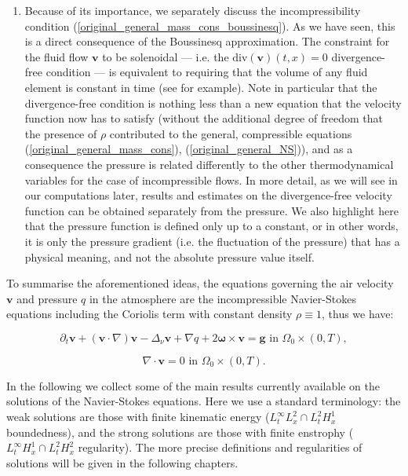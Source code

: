 \documentclass[12pt]{report}
\numberwithin{theorem}{chapter}
\numberwithin{corollary}{chapter}
\numberwithin{lemma}{chapter}
\numberwithin{remark}{chapter}
\numberwithin{definition}{chapter}
\numberwithin{prop}{chapter}
\begin{document}
\begin{enumerate}
\item Because of its importance, we separately discuss the incompressibility condition (\ref{original_general_mass_cons_boussinesq}). As we have seen, this is a direct consequence of the Boussinesq approximation. The constraint for the fluid flow $\mathbf{v}$ to be solenoidal --- i.e. the $\text{div}(\mathbf{v})(t,x) = 0$ divergence-free condition --- is equivalent to requiring that the volume of any fluid element is constant in time (see \cite{boyer2012mathematical} for example). Note in particular that the divergence-free condition is nothing less than a new equation that the velocity function now has to satisfy (without the additional degree of freedom that the presence of $\rho$ contributed to the general, compressible equations (\ref{original_general_mass_cons}), (\ref{original_general_NS})), and as a consequence the pressure is related differently to the other thermodynamical variables for the case of incompressible flows. In more detail, as we will see in our computations later, results and estimates on the divergence-free velocity function can be obtained separately from the pressure. We also highlight here that the pressure function is defined only up to a constant, or in other words, it is only the pressure gradient (i.e. the fluctuation of the pressure) that has a physical meaning, and not the absolute pressure value itself.

\end{enumerate}

To summarise the aforementioned ideas, the equations governing the air velocity $\mathbf{v}$ and pressure $q$ in the atmosphere are the incompressible Navier-Stokes equations including the Coriolis term with constant density $\rho \equiv 1$, thus we have:

\begin{equation} \label{originalEQ-V}
  \partial_t \mathbf{v} + (\mathbf{v} \cdot \nabla)\mathbf{v} -\Delta_{\nu} \mathbf{v} + \nabla q + 2 \mathbf{\omega} \times \mathbf{v}= \mathbf{g} \text{ in } \Omega_0 \times (0,T),
\end{equation}
    
\begin{equation} \label{originalEQ-I}
  \nabla \cdot \mathbf{v} = 0 \text{ in } \Omega_0 \times (0,T).
\end{equation}

In the following we collect some of the main results currently available on the solutions of the Navier-Stokes equations. Here we use a standard terminology: the weak solutions are those with finite kinematic energy ($L_t^\infty L_x^2 \cap L_t^2 H_x^1$ boundedness), and the strong solutions are those with finite enstrophy ($L_t^\infty H_x^1 \cap L_t^2 H_x^2$ regularity). The more precise definitions and regularities of solutions will be given in the following chapters.
\end{document}

